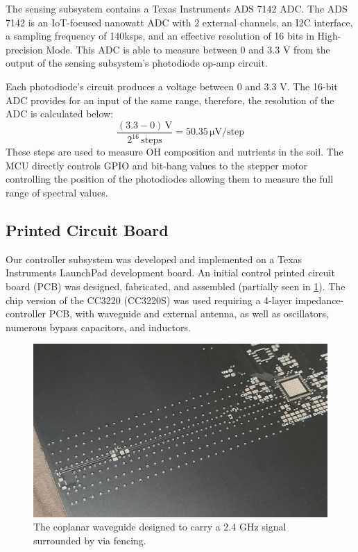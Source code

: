 \documentclass[journal]{IEEEtran}
\begin{document}
The sensing subsystem contains a Texas Instruments ADS 7142 ADC. The ADS 7142 is an IoT-focused nanowatt ADC with 2 external channels, an I2C interface, a sampling frequency of 140ksps, and an effective resolution of 16 bits in High-precision Mode. This ADC is able to measure between 0 and 3.3 V from the output of the sensing subsystem's photodiode op-amp circuit.

Each photodiode's circuit produces a voltage between 0 and 3.3 V. The 16-bit ADC provides for an input of the same range, therefore, the resolution of the ADC is calculated below:
\begin{equation}
	\frac{(3.3 - 0)\,\mathrm{V}}{2^{16}\,\mathrm{steps}} =
	50.35\,\mathrm{\mu V}/\mathrm{step}
\end{equation}
These steps are used to measure OH composition and nutrients in the soil. The MCU directly controls GPIO and bit-bang values to the stepper motor controlling the position of the photodiodes allowing them to measure the full range of spectral values.
\subsection{Printed Circuit Board} Our controller subsystem was developed and implemented on a Texas Instruments LaunchPad development board. An initial control printed circuit board (PCB) was designed, fabricated, and assembled (partially seen in \ref{fig:mcu_v1_cpwg}). The chip version of the CC3220 (CC3220S) was used requiring a 4-layer impedance-controller PCB, with waveguide and external antenna, as well as oscillators, numerous bypass capacitors, and inductors.

\begin{figure}[H]
	\centering
	\label{fig:mcu_v1_cpwg}
	\includegraphics[width=\linewidth]{images/mcu_v1_cpwg.jpg}
	\caption{The coplanar waveguide designed to carry a 2.4 GHz signal surrounded by via fencing.}
\end{figure}
\end{document}
